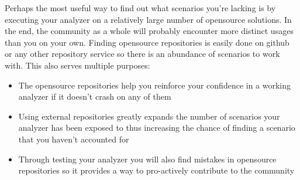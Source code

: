 Perhaps the most useful way to find out what scenarios you're lacking is by executing your analyzer on a relatively large number of \gls{opensource} \glspl{solution}. In the end, the community as a whole will probably encounter more distinct usages than you on your own. Finding \gls{opensource} repositories is easily done on github or any other repository service so there is an abundance of scenarios to work with. This also serves multiple purposes:

\begin{itemize}
\item The \gls{opensource} repositories help you reinforce your confidence in a working analyzer if it doesn't crash on any of them
\item Using external repositories greatly expands the number of scenarios your analyzer has been exposed to thus increasing the chance of finding a scenario that you haven't accounted for
\item Through testing your analyzer you will also find mistakes in \gls{opensource} repositories so it provides a way to pro-actively contribute to the community
\end{itemize}




